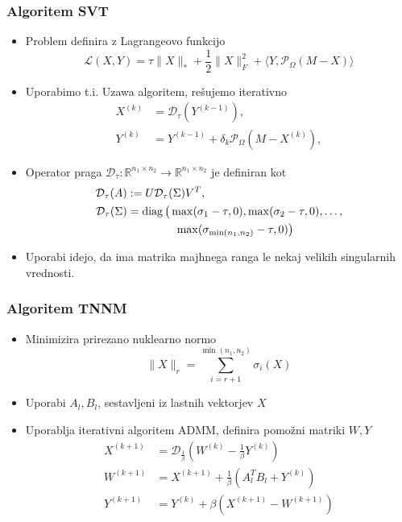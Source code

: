 \documentclass{beamer}
\newcommand{\nnorm}[1]{\lVert#1\rVert_*}
\newcommand{\fnorm}[1]{\lVert#1\rVert_F}
\newcommand{\norm}[1]{\lVert#1\rVert}
\newcommand{\proj}{\mathcal{P}_\Omega}
\newcommand{\shrink}{\mathcal{D}}
\newcommand{\trOp}[2]{\langle #1, #2 \rangle}
\DeclareMathOperator{\diag}{diag}
\begin{document}
\begin{frame}
  \frametitle{Algoritem SVT}
  \begin{itemize}
    \item Problem definira z \alert{Lagrangeovo funkcijo} \[
            \mathcal{L}(X, Y) = \tau \nnorm{X} + \frac{1}{2}\fnorm{X}^2 + \trOp{Y}{\proj(M-X)}
          \]
    \item Uporabimo t.i. \alert{Uzawa algoritem}, rešujemo iterativno
          \begin{align*}
            X^{(k)} & = \shrink_\tau(Y^{(k-1)}),                 \\
            Y^{(k)} & = Y^{(k-1)} + \delta_k \proj(M - X^{(k)}),
          \end{align*}
    \item \alert{Operator praga} $\shrink_\tau: \mathbb{R}^{n_1 \times n_2} \rightarrow \mathbb{R}^{n_1 \times n_2}$ je definiran kot
          \begin{align*}
            \shrink_\tau(A) & := U \shrink_\tau(\Sigma) V^T, \\ \shrink_\tau(\Sigma) &= \diag\big(\max(\sigma_1 - \tau, 0),
            \max(\sigma_2-\tau,0),\ldots,                    \\
                            & \hspace{1.5cm}
            \max(\sigma_{\min(n_1,n_2)}-\tau,0)\big)
          \end{align*}
    \item Uporabi idejo, da ima matrika majhnega ranga \alert{le nekaj velikih singularnih vrednosti}.
  \end{itemize}
\end{frame}

\begin{frame}
  \frametitle{Algoritem TNNM}
  \begin{itemize}
    \item Minimizira \alert{prirezano nuklearno normo} \[
            \norm{X}_r = \sum_{i = r + 1}^{\min(n_1, n_2)} \sigma_i(X)
          \]
    \item Uporabi $A_l, B_l$, sestavljeni iz \alert{lastnih vektorjev} $X$
    \item Uporablja iterativni algoritem \alert{ADMM}, definira pomožni matriki $W, Y$
          \begin{align*}
            X^{(k+1)} & = \shrink_\frac{1}{\beta}(W^{(k)} - \frac{1}{\beta} Y^{(k)}) \\
            W^{(k+1)} & = X^{(k+1)} + \frac{1}{\beta}(A_l^T B_l + Y^{(k)})           \\
            Y^{(k+1)} & = Y^{(k)} + \beta(X^{(k+1)}- W^{(k+1)})
          \end{align*}
  \end{itemize}
\end{frame}
\end{document}

